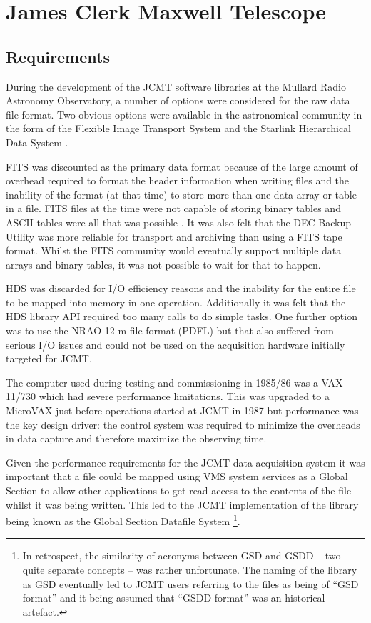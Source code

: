 \documentclass[final,authoryear,5p,times,twocolumn]{elsarticle}
\newcommand{\ascl}[1]{\href{http://www.ascl.net/#1}{ascl:#1}}
\begin{document}
\section{James Clerk Maxwell Telescope}

\subsection{Requirements}

During the development of the JCMT software libraries at the Mullard
Radio Astronomy Observatory, a number of options were considered for
the raw data file format.  Two obvious options were available in the
astronomical community in the form of the Flexible Image Transport System
\citep[FITS;][]{1981A&AS...44..363W} and the Starlink Hierarchical
Data System \citep[HDS;][\ascl{1502.009}]{1982QJRAS..23..485D,2015HDS}.

FITS was discounted as the primary data format because of the large
amount of overhead required to format the header information when
writing files and the inability of the format (at that time) to store
more than one
data array or table in a file. FITS files at the time were not capable
of storing binary tables and ASCII tables were all that was possible
\citep{1988A&AS...73..365H}. It was also felt that the DEC Backup
Utility was more reliable for transport and archiving than using a
FITS tape format. Whilst the FITS community would
eventually support multiple data arrays and binary tables, it was not
possible to wait for that to happen.

HDS was discarded for I/O efficiency reasons and the inability for the
entire file to be mapped into memory in one operation. Additionally it
was felt that the HDS library API required too many calls to do simple
tasks. One further option was to use the NRAO 12-m file format (PDFL)
but that also suffered from serious I/O issues and could not be used
on the acquisition hardware initially targeted for JCMT.

The computer used during testing and commissioning in 1985/86 was a
VAX 11/730 which had severe performance limitations. This was upgraded
to a MicroVAX just before operations started at JCMT in 1987 but
performance was the key design driver: the control system was required
to minimize the overheads in data capture and therefore maximize the
observing time.

Given the performance requirements for the JCMT data acquisition
system it was important that a file could be mapped using VMS system
services as a Global Section to allow other applications to get read
access to the contents of the file whilst it was being written.  This
led to the JCMT implementation of the library being known as the
Global Section Datafile System \citep[GSD;][]{mtin33}\footnote{In retrospect,
the similarity of acronyms between GSD and GSDD -- two quite separate
concepts -- was rather unfortunate. The
  naming of the library as GSD eventually led to JCMT users referring
  to the files as being of ``GSD format'' and it being assumed that ``GSDD
  format'' was an historical artefact.}.
\end{document}
